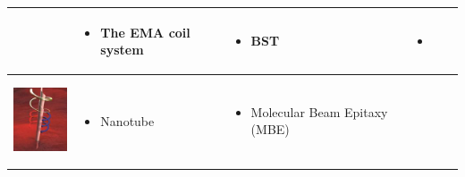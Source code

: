 \documentclass[12pt,a4paper,titlepage]{report}
\begin{document}
\begin{table}[h!]
\begin{tabular}{ c m{2.5cm}  m{4.3cm} m{3cm} m{2cm}}
\begin{minipage}[t]{3cm}
\begin{itemize}
      \end{itemize}
    \end{minipage}
    & 
    \begin{minipage}[t]{3cm}
      \begin{itemize}
        \item The EMA coil system
     
      \end{itemize}
    \end{minipage}
&
  \begin{minipage}[t]{4cm}
      \begin{itemize}
        \item BST
	
     
      \end{itemize}
    \end{minipage}

&
	 \begin{minipage}[t]{3cm}
	   \begin{itemize}
        \item \citep{kim2013fabrication}
   
      \end{itemize}
   \end{minipage}
    \\ \hline



 \begin{minipage}{.3\textwidth}
      \includegraphics[width=\linewidth, height=25mm]{tube_ta}
    \end{minipage}
    &
    \begin{minipage}[t]{3cm}
      \begin{itemize}
        \item Nanotube
        
      \end{itemize}
    \end{minipage}
    & 
    \begin{minipage}{4cm}
      \begin{itemize}
        \item Molecular Beam Epitaxy (MBE)
	   
	   
    
      \end{itemize}
    \end{minipage}
	&





\end{tabular}
\end{table}
\end{document}
